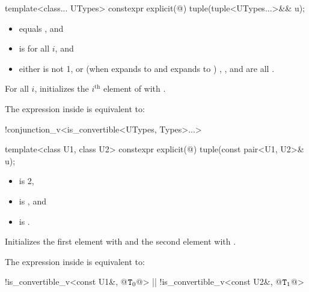 %
\begin{itemdecl}
template<class... UTypes> constexpr explicit(@\seebelow@) tuple(tuple<UTypes...>&& u);
\end{itemdecl}

\begin{itemdescr}
\pnum
\constraints
\begin{itemize}
\item
{} equals , and

\item
{} is  for all $i$, and

\item
either
 is not 1, or
(when  expands to  and  expands to )
, ,
and  are all .
\end{itemize}

\pnum
\effects
For all $i$,
initializes the $i^\text{th}$ element of  with
.

\pnum
\remarks
The expression inside  is equivalent to:
\begin{codeblock}
!conjunction_v<is_convertible<UTypes, Types>...>
\end{codeblock}
\end{itemdescr}

%
%
\begin{itemdecl}
template<class U1, class U2> constexpr explicit(@\seebelow@) tuple(const pair<U1, U2>& u);
\end{itemdecl}

\begin{itemdescr}
\pnum
\constraints
\begin{itemize}
\item {} is 2,
\item {} is , and
\item {} is .
\end{itemize}

\pnum
\effects
Initializes the first element with  and the
second element with .

\pnum
\remarks
The expression inside  is equivalent to:
\begin{codeblock}
!is_convertible_v<const U1&, @$\texttt{T}_0$@> || !is_convertible_v<const U2&, @$\texttt{T}_1$@>
\end{codeblock}
\end{itemdescr}

